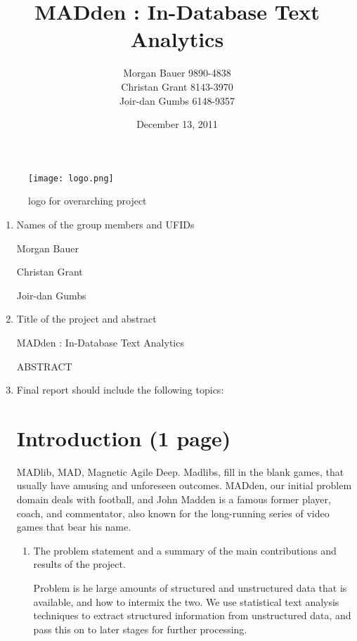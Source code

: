 \documentclass{article}
\title{MADden : In-Database Text Analytics}
\author{Morgan Bauer 9890-4838 \\
  Christan Grant 8143-3970 \\
  Joir-dan Gumbs 6148-9357}
\date{December 13, 2011}
\begin{document}
\maketitle

\begin{figure}
  \begin{center}
    \texttt{[image: logo.png]}
    \caption{logo for overarching project}
    \label{fig:logo}
  \end{center}
\end{figure}

\begin{enumerate}
\item Names of the group members and UFIDs


  Morgan Bauer

  Christan Grant

  Joir-dan Gumbs

\item Title of the project and abstract

  MADden : In-Database Text Analytics

  ABSTRACT



\item Final report should include the following topics:

  \section{Introduction (1 page)}

  MADlib, MAD, Magnetic Agile Deep.
  Madlibs, fill in the blank games, that usually have amusing and unforeseen outcomes.
  MADden, our initial problem domain deals with football,
  and John Madden is a famous former player, coach, and commentator,
  also known for the long-running series of video games that bear his name.

  \begin{enumerate}
  \item The problem statement and a summary of the main contributions and results of the project.

    Problem is he large amounts of structured and unstructured data that is available, and how to intermix the two.
    We use statistical text analysis techniques to extract structured information from unstructured data,
    and pass this on to later stages for further processing.


\end{enumerate}
\end{enumerate}
\end{document}
